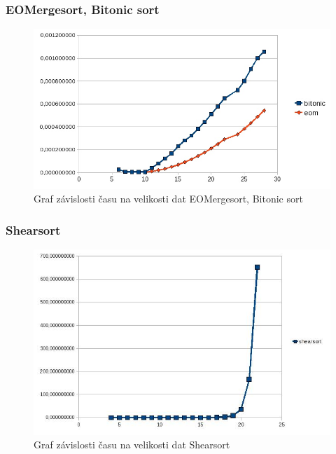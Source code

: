 \documentclass[12pt]{article}
\begin{document}
\subsubsection{EOMergesort, Bitonic sort}
\begin{figure}[H]
\begin{center}
\includegraphics[width=14cm]{cuda-eom-bit.jpg}
\caption{Graf závislosti času na velikosti dat EOMergesort, Bitonic sort}
\label{fig:cuda-eom-bit}
\end{center}
\end{figure}

\subsubsection{Shearsort}
\begin{figure}[H]
\begin{center}
\includegraphics[width=14cm]{cuda-shearsort.jpg}
\caption{Graf závislosti času na velikosti dat Shearsort}
\label{fig:cuda-shearsort}
\end{center}
\end{figure}
\end{document}
